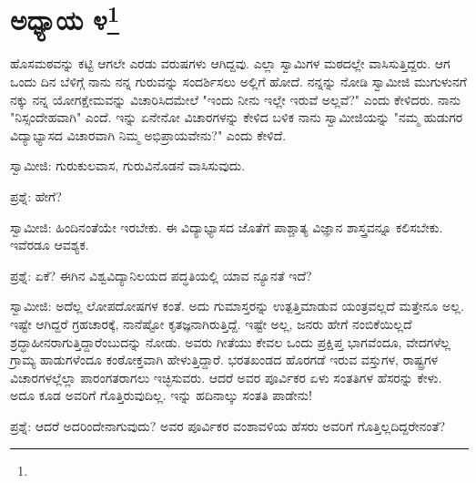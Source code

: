 \chapter{ಅಧ್ಯಾಯ ೪\protect\footnote{}}

ಹೊಸಮಠವನ್ನು ಕಟ್ಟಿ ಆಗಲೇ ಎರಡು ವರುಷಗಳು ಆಗಿದ್ದವು. ಎಲ್ಲಾ ಸ್ವಾಮಿಗಳ ಮಠದಲ್ಲೇ ವಾಸಿಸುತ್ತಿದ್ದರು. ಆಗ ಒಂದು ದಿನ ಬೆಳಿಗ್ಗೆ ನಾನು ನನ್ನ ಗುರುವನ್ನು ಸಂದರ್ಶಿಸಲು ಅಲ್ಲಿಗೆ ಹೋದೆ. ನನ್ನನ್ನು ನೋಡಿ ಸ್ವಾಮೀಜಿ ಮುಗುಳುನಗೆ ನಕ್ಕು ನನ್ನ ಯೋಗಕ್ಷೇಮವನ್ನು ವಿಚಾರಿಸಿದಮೇಲೆ "ಇಂದು ನೀನು ಇಲ್ಲೇ ಇರುವೆ ಅಲ್ಲವೆ?" ಎಂದು ಕೇಳಿದರು. ನಾನು "ನಿಸ್ಸಂದೇಹವಾಗಿ" ಎಂದೆ. ಇನ್ನು ಏನೇನೋ ವಿಚಾರಗಳನ್ನು ಕೇಳಿದ ಬಳಿಕ ನಾನು ಸ್ವಾಮೀಜಿಯನ್ನು "ನಮ್ಮ ಹುಡುಗರ ವಿದ್ಯಾಭ್ಯಾಸದ ವಿಚಾರವಾಗಿ ನಿಮ್ಮ ಅಭಿಪ್ರಾಯವೇನು?" ಎಂದು ಕೇಳಿದೆ.

ಸ್ವಾಮೀಜಿ: ಗುರುಕುಲವಾಸ, ಗುರುವಿನೊಡನೆ ವಾಸಿಸುವುದು.

ಪ್ರಶ್ನೆ: ಹೇಗೆ?

ಸ್ವಾಮೀಜಿ: ಹಿಂದಿನಂತೆಯೇ ಇರಬೇಕು. ಈ ವಿದ್ಯಾಭ್ಯಾಸದ ಜೊತೆಗೆ ಪಾಶ್ಚಾತ್ಯ ವಿಜ್ಞಾನ ಶಾಸ್ತ್ರವನ್ನೂ ಕಲಿಸಬೇಕು. ಇವೆರಡೂ ಆವಶ್ಯಕ.

ಪ್ರಶ್ನೆ: ಏಕೆ? ಈಗಿನ ವಿಶ್ವವಿದ್ಯಾನಿಲಯದ ಪದ್ಧತಿಯಲ್ಲಿ ಯಾವ ನ್ಯೂನತೆ ಇದೆ?

ಸ್ವಾಮೀಜಿ: ಅದೆಲ್ಲ ಲೋಪದೋಷಗಳ ಕಂತೆ. ಅದು ಗುಮಾಸ್ತರನ್ನು ಉತ್ಪತ್ತಿಮಾಡುವ ಯಂತ್ರವಲ್ಲದೆ ಮತ್ತೇನೂ ಅಲ್ಲ. ಇಷ್ಟೇ ಆಗಿದ್ದರೆ ಗ್ರಹಚಾರಕ್ಕೆ, ನಾನೆಷ್ಟೋ ಕೃತಜ್ಞನಾಗಿರುತ್ತಿದ್ದೆ. ಇಷ್ಟೇ ಅಲ್ಲ, ಜನರು ಹೇಗೆ ನಂಬಿಕೆಯಿಲ್ಲದೆ ಶ್ರದ್ಧಾಹೀನರಾಗುತ್ತಿದ್ದಾರೆಂಬುದನ್ನು ನೋಡು. ಅವರು ಗೀತೆಯು ಕೇವಲ ಒಂದು ಪ್ರಕ್ಷಿಪ್ತ ಭಾಗವೆಂದೂ, ವೇದಗಳೆಲ್ಲ ಗ್ರಾಮ್ಯ ಹಾಡುಗಳೆಂದೂ ಕಂಠೋಕ್ತವಾಗಿ ಹೇಳುತ್ತಿದ್ದಾರೆ. ಭರತಖಂಡದ ಹೊರಗಡೆ ಇರುವ ವಸ್ತುಗಳ, ರಾಷ್ಟ್ರಗಳ ವಿಚಾರಗಳಲ್ಲೆಲ್ಲಾ ಪಾರಂಗತರಾಗಲು ಇಚ್ಛಿಸುವರು. ಆದರೆ ಅವರ ಪೂರ್ವಿಕರ ಏಳು ಸಂತತಿಗಳ ಹೆಸರನ್ನು ಕೇಳು. ಅದೂ ಕೂಡ ಅವರಿಗೆ ಗೊತ್ತಿರುವುದಿಲ್ಲ. ಇನ್ನು ಹದಿನಾಲ್ಕು ಸಂತತಿ ಪಾಡೇನು!

ಪ್ರಶ್ನೆ: ಆದರೆ ಅದರಿಂದೇನಾಗುವುದು? ಅವರ ಪೂರ್ವಿಕರ ವಂಶಾವಳಿಯ ಹೆಸರು ಅವರಿಗೆ ಗೊತ್ತಿಲ್ಲದಿದ್ದರೇನಂತೆ?

